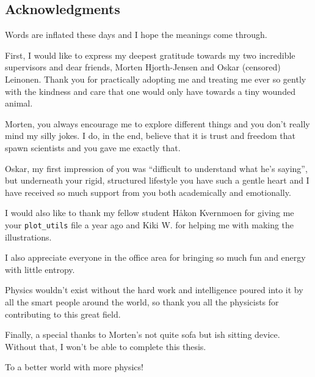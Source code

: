 \documentclass[UKenglish,openany]{uiomasterthesis}  %
\begin{document}
\begin{preface}


\chapter*{Acknowledgments}
Words are inflated these days and I hope the meanings come through. 

First, I would like to express my deepest gratitude towards my two incredible supervisors and dear friends, Morten Hjorth-Jensen and Oskar (censored) Leinonen. Thank you for practically adopting me and treating me ever so gently with the kindness and care that one would only have towards a tiny wounded animal.  

Morten, you always encourage me to explore different things and you don’t really mind my silly jokes. I do, in the end, believe that it is trust and freedom that spawn scientists and you gave me exactly that.

Oskar, my first impression of you was “difficult to understand what he’s saying”, but underneath your rigid, structured lifestyle you have such a gentle heart and I have received so much support from you both academically and emotionally. 

I would also like to thank my fellow student Håkon Kvernmoen for giving me your \texttt{plot\_utils} file a year ago and Kiki W. for helping me with making the illustrations. 

I also appreciate everyone in the office area for bringing so much fun and energy with little entropy. 

Physics wouldn't exist without the hard work and intelligence poured into it by all the smart people around the world, so thank you all the physicists for contributing to this great field. 

Finally, a special thanks to Morten's not quite sofa but ish sitting device. Without that, I won't be able to complete this thesis. 

To a better world with more physics!


\end{preface}

\mainmatter{}










\backmatter{}
\printbibliography{}
\end{document}
